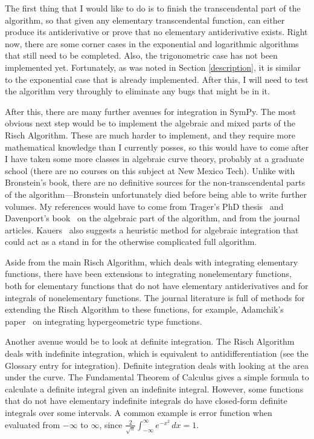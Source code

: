 The first thing that I would like to do is to finish the
\gls{transcendental} part of the algorithm, so that given any
\gls{elementary} \gls{transcendental} function, \rischintegrate{} can
either produce its antiderivative or prove that no \gls{elementary}
antiderivative exists.  Right now, there are some corner cases in the
exponential and logarithmic algorithms that still need to be completed. 
Also, the trigonometric case has not been implemented yet.  Fortunately,
as was noted in Section \ref{description}, it is similar to the
exponential case that is already implemented.  After this, I will need
to test the algorithm very throughly to eliminate any bugs that might be
in it.

After this, there are many further avenues for \gls{integration} in
SymPy.  The most obvious next step would be to implement the \gls{algebraic}
and mixed parts of the Risch Algorithm.  These are much harder to
implement, and they require more mathematical knowledge than I currently
posses, so this would have to come after I have taken some more classes
in \gls{algebraic} curve theory, probably at a graduate school (there are no
courses on this subject at New Mexico Tech).  Unlike with Bronstein's
book, there are no definitive sources for the non-\gls{transcendental}
parts of the algorithm---Bronstein unfortunately died before being able
to write further volumes.  My references would have to come
from Trager's PhD thesis~\cite{trager1984integration} and Davenport's
book~\cite{davenport1984integration} on the \gls{algebraic} part of the
algorithm, and from the journal articles.  Kauers~\cite{kauers2008integration} also suggests a heuristic method for
\gls{algebraic} \gls{integration} that could act as a stand in for the
otherwise complicated full algorithm.

Aside from the main Risch Algorithm, which deals with integrating
\gls{elementary} functions, there have been extensions to integrating
nonelementary functions, both for \gls{elementary} functions that do not
have \gls{elementary} antiderivatives and for integrals of nonelementary
functions.  The journal literature is full of methods for extending the
Risch Algorithm to these functions, for example, Adamchik's paper~\cite{adamchik1990hypergeometric} on integrating hypergeometric type
functions.

Another avenue would be to look at definite \gls{integration}.  The
Risch Algorithm deals with indefinite \gls{integration}, which is
equivalent to antidifferentiation (see the Glossary entry for
\gls{integration}).  Definite \gls{integration} deals with looking at
the area under the curve.  The Fundamental Theorem of Calculus gives a
simple formula to calculate a definite integral given an indefinite
integral.  However, some functions that do not have \gls{elementary}
indefinite integrals do have closed-form definite integrals over some
intervals.  A common example is \gls{error function} when evaluated from
$-\infty$ to $\infty$, since
$\frac{2}{\sqrt{\pi}}\int_{-\infty}^\infty{e^{-x^2}\,dx}=1$.

